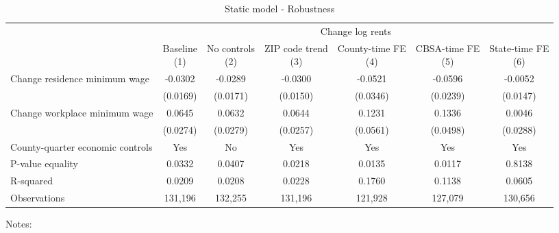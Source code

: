\begin{table}
    \caption{Static model - Robustness}
    \label{tab:static_robust}
    \centering

    \begin{tabular}{@{}lcccccc@{}}
        \toprule
                                                  & \multicolumn{6}{c}{Change log rents}                                          \\ \cmidrule(l){2-7}
                                                  & \shortstack{Baseline\\(1)}       & \shortstack{No controls\\(2)} & \shortstack{ZIP code trend\\(3)} 
                                                  & \shortstack{County-time FE\\(4)} & \shortstack{CBSA-time FE\\(5)} & \shortstack{State-time FE\\(6)} \\ \midrule
        Change residence minimum wage             & -0.0302      & -0.0289         & -0.0300       & -0.0521        & -0.0596       & -0.0052             \\
                                                  & (0.0169)    & (0.0171)       & (0.0150)     & (0.0346)      & (0.0239)     & (0.0147)           \\
        Change workplace minimum wage             & 0.0645      & 0.0632         & 0.0644       & 0.1231        & 0.1336       & 0.0046             \\
                                                  & (0.0274)    & (0.0279)       & (0.0257)     & (0.0561)      & (0.0498)     & (0.0288)           \\  \midrule
        County-quarter economic controls               & Yes      &  No         & Yes       & Yes        & Yes       & Yes             \\
        P-value equality                          & 0.0332      & 0.0407         & 0.0218       & 0.0135        & 0.0117       & 0.8138             \\
        R-squared                                 & 0.0209      & 0.0208         & 0.0228       & 0.1760        & 0.1138       & 0.0605             \\
        Observations                              & 131,196     & 132,255        & 131,196      & 121,928       & 127,079      & 130,656            \\ \bottomrule
    \end{tabular}

    \begin{minipage}{.95\textwidth} \footnotesize
        \vspace{2mm}
        Notes: 
    \end{minipage}
\end{table}
